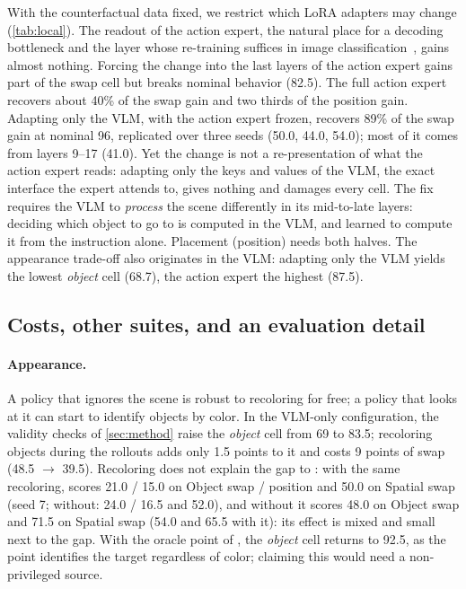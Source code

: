 With the counterfactual data fixed, we restrict which LoRA adapters may change (\cref{tab:local}).
The readout of the action expert, the natural place for a decoding bottleneck and the layer whose re-training suffices in
image classification~\cite{kirichenko2023dfr}, gains almost nothing.
Forcing the change into the last layers of the action expert gains part of the swap cell but breaks nominal behavior
(82.5).
The full action expert recovers about 40\% of the swap gain and two thirds of the position gain.
Adapting only the VLM, with the action expert frozen, recovers 89\% of the swap gain at nominal 96, replicated over three
seeds (50.0, 44.0, 54.0); most of it comes from layers 9--17 (41.0).
Yet the change is not a re-presentation of what the action expert reads: adapting only the keys and values of the VLM, the
exact interface the expert attends to, gives nothing and damages every cell.
The fix requires the VLM to \emph{process} the scene differently in its mid-to-late layers: deciding which object to go
to is computed in the VLM, and \pizf learned to compute it from the instruction alone.
Placement (position) needs both halves.
The appearance trade-off also originates in the VLM: adapting only the VLM yields the lowest \emph{object} cell (68.7),
the action expert the highest (87.5).

\subsection{Costs, other suites, and an evaluation detail}
\label{sec:exp:limits}

\paragraph{Appearance.}
A policy that ignores the scene is robust to recoloring for free; a policy that looks at it can start to identify objects
by color.
In the VLM-only configuration, the validity checks of \cref{sec:method} raise the \emph{object} cell from 69 to 83.5;
recoloring objects during the rollouts adds only 1.5 points to it and costs 9 points of swap (48.5 $\to$ 39.5).
Recoloring does not explain the gap to \ect: with the same recoloring, \ect scores 21.0 / 15.0 on Object swap /
position and 50.0 on Spatial swap (seed 7; without: 24.0 / 16.5 and 52.0), and \ours without it scores 48.0 on
Object swap and 71.5 on Spatial swap (54.0 and 65.5 with it): its effect is mixed and small next to the gap. With the oracle point of \pt, the \emph{object} cell
returns to 92.5, as the point identifies the target regardless of color; claiming this would need a non-privileged source.

